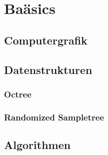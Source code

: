 \chapter{Baäsics}
\section{Computergrafik}
\section{Datenstrukturen}
\subsection{Octree}
\subsection{Randomized Sampletree}
\section{Algorithmen}


